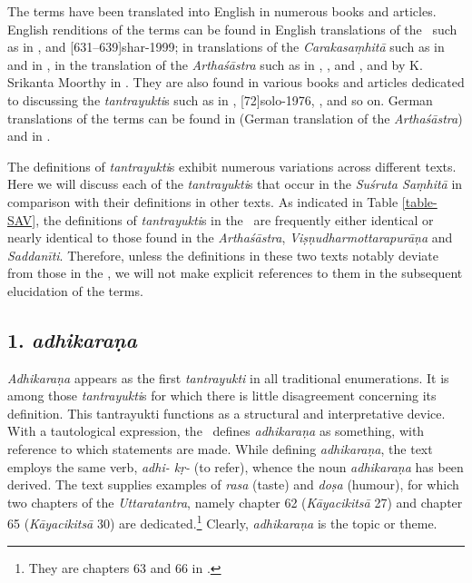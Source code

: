 \label{tantra-trans}
The terms have been translated into English in numerous books and articles. English renditions of the terms can be found in English translations of the \SS\ such as in \cite[171--172]{sing-1980}, and [631--639]{shar-1999}; in translations of the \emph{Carakasaṃhitā} such as in \cite[436--444]{shar-2006} and in \cite[1050]{gula-1949}, in the translation of the \emph{Arthaśāstra} such as in \cite[459]{sham-1951}, \cite[593]{kang-1969}, \cite[1103]{unni-2006} and \cite[]{oliv-2013}, and by K. Srikanta Moorthy in \cite[Appendix xi--xxxiv]{muth-1976}. They are also found in various books and articles dedicated to discussing the \emph{tantrayukti}s such as in \cite[601--602]{ober-1968}, [72]{solo-1976}, \cite[34--155]{lele-1981}, \citeyear[36--150]{lele-2006} and so on. German translations of the terms can be found in \cite[663--664]{meye-1926} (German translation of the \emph{Arthaśāstra}) and in \cite{pret-1991}.


The definitions of \emph{tantrayukti}s exhibit numerous variations across different texts. Here we will discuss each of the \emph{tantrayukti}s that occur in the \emph{Suśruta Saṃhitā} in comparison with their definitions in other texts. As indicated in Table \ref{table-SAV}, the definitions of \emph{tantrayukti}s in the \SS\ are frequently either identical or nearly identical to those found in the \emph{Arthaśāstra}, \emph{Viṣṇudharmottarapurāṇa} and \emph{Saddanīti}. Therefore, unless the definitions in these two texts notably deviate from those in the \SS, we will not make explicit references to them in the subsequent elucidation of the terms. 


\subsection{1. \emph{adhikaraṇa}}

\emph{Adhikaraṇa} appears as the first \emph{tantrayukti} in all traditional 
enumerations. It is among those \emph{tantrayukti}s for which there is little 
disagreement concerning its definition. This tantrayukti functions as a 
structural and interpretative device. With a tautological expression, the \SS\ 
defines \emph{adhikaraṇa} as something, with reference to which statements 
are made. While defining \emph{adhikaraṇa}, the text employs the same verb, 
\emph{adhi- kṛ-} (to refer), whence the noun \emph{adhikaraṇa} has been 
derived. The text supplies examples of \emph{rasa} (taste) and \emph{doṣa} 
(humour), for which two chapters of the \emph{Uttaratantra}, namely chapter 
62 (\emph{Kāyacikitsā} 27) and  chapter 65 (\emph{Kāyacikitsā} 30) are 
dedicated.\footnote{They are chapters 63 and 66 in \Su{A}{B}.} Clearly, 
\emph{adhikaraṇa} is the topic or theme. 

